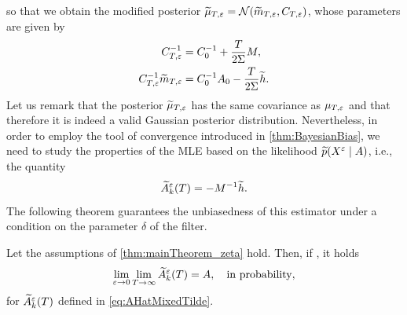 \documentclass[review,onefignum,onetabnum]{siamonline190516}
\begin{document}
so that we obtain the modified posterior $\widetilde \mu_{T,\varepsilon} = \mathcal N(\widetilde m_{T, \varepsilon}, C_{T, \varepsilon})$, whose parameters are given by
\begin{equation}
\begin{aligned}
	C_{T, \varepsilon}^{-1} &= C_0^{-1} + \frac{T}{2\Sigma} M, \\
	C_{T,\varepsilon}^{-1}\widetilde m_{T,\varepsilon} &= C_0^{-1}A_0 - \frac{T}{2\Sigma} \widetilde h. 
\end{aligned}	
\end{equation}
Let us remark that the posterior $\widetilde \mu_{T,\varepsilon}$ has the same covariance as $\mu_{T,\varepsilon}$ and that therefore it is indeed a valid Gaussian posterior distribution. Nevertheless, in order to employ the tool of convergence introduced in \cref{thm:BayesianBias}, we need to study the properties of the MLE based on the likelihood $\widetilde p(X^\varepsilon \mid A)$, i.e., the quantity
\begin{equation}\label{eq:AHatMixedTilde}
	\widetilde A^\epl_k(T) = - M^{-1} \widetilde h.
\end{equation}
The following theorem guarantees the unbiasedness of this estimator under a condition on the parameter $\delta$ of the filter.
\begin{theorem}\label{thm:mainTheoremTilde} Let the assumptions of \cref{thm:mainTheorem_zeta} hold. Then, if , it holds
	\begin{equation}
	\lim_{\varepsilon \to 0} \lim_{T \to \infty} \widetilde A^\varepsilon_k(T) = A, \quad \text{in probability},
	\end{equation} 
	for $\widetilde A^\varepsilon_k(T)$ defined in \eqref{eq:AHatMixedTilde}.
\end{theorem}
\end{document}
